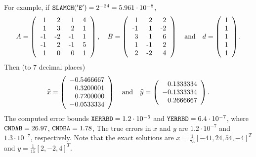 \noindent
For example, if ${\tt SLAMCH('E')} = 2^{-24} = 5.961 \cdot 10^{-8}$,
$$  A = \left( \begin{tabular}{rrrr}
                  1 &  2 &  1 & 4 \\
                  1 &  3 &  2 & 1 \\
                 -1 & -2 & -1 & 1 \\
                 -1 &  2 & -1 & 5 \\
                  1 &  0 &  0 & 1
               \end{tabular} \right), \quad
    B = \left( \begin{tabular}{rrr}
                  1 &  2 &  2 \\
                 -1 &  1 & -2\\
                  3 &  1 &  6 \\
                  1 & -1 &  2 \\
                  2 & -2 &  4
               \end{tabular} \right)
    \quad \mbox{and} \quad
    d = \left( \begin{array}{r}
                   1 \\
                   1 \\
                   1 \\
                   1 \\
                   1
               \end{array} \right). $$
Then (to 7 decimal places)
$$  \widehat{x} = \left( \begin{array}{r}
                            -0.5466667  \\
                             0.3200001  \\
                             0.7200000  \\
                            -0.0533334
                        \end{array} \right)
    \quad \mbox{and} \quad
    \widehat{y} = \left( \begin{array}{r}
                         0.1333334 \\
                        -0.1333334 \\
                         0.2666667
                    \end{array} \right).$$
The computed error bounds
${\tt XERRBD} = 1.2\cdot10^{-5}$ and ${\tt YERRBD} = 6.4\cdot10^{-7}$,
where ${\tt CNDAB} = 26.97$, ${\tt CNDBA} = 1.78$,
The true errors in $x$ and $y$ are $1.2\cdot10^{-7}$ and
$1.3\cdot10^{-7}$, respectively.  Note that the exact solutions are
$x = \frac{1}{75}[-41,24,54,-4]^T$ and
$y = \frac{1}{15}[2,-2,4]^T$.


